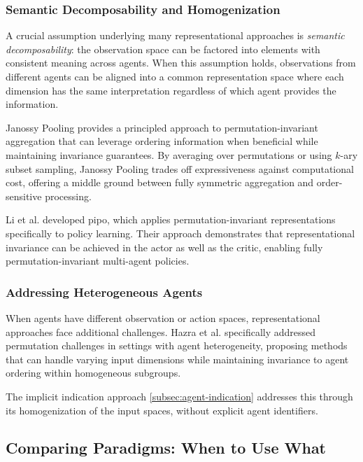 \subsubsection{Semantic Decomposability and Homogenization}

A crucial assumption underlying many representational approaches
is \emph{semantic decomposability}: the observation space can be
factored into elements with consistent meaning across agents.
When this assumption holds, observations from different agents
can be aligned into a common representation space where each
dimension has the same interpretation regardless of which agent
provides the information.

Janossy Pooling \cite{murphy2019} provides a principled approach
to permutation-invariant aggregation that can leverage ordering
information when beneficial while maintaining invariance guarantees.
By averaging over permutations or using $k$-ary subset sampling,
Janossy Pooling trades off expressiveness against computational
cost, offering a middle ground between fully symmetric aggregation
and order-sensitive processing.

Li et al. \cite{li2021b} developed \gls{pipo}, which applies 
permutation-invariant representations specifically to policy learning. 
Their approach demonstrates that representational invariance 
can be achieved in the actor as well as the critic, 
enabling fully permutation-invariant multi-agent policies.

\subsubsection{Addressing Heterogeneous Agents}

When agents have different observation or action spaces,
representational approaches face additional challenges.
Hazra et al. \cite{hazra2024} specifically addressed permutation
challenges in settings with agent heterogeneity, proposing
methods that can handle varying input dimensions while
maintaining invariance to agent ordering within homogeneous
subgroups.

The implicit indication approach \cref{subsec:agent-indication}
addresses this through its homogenization of the input spaces,
without explicit agent identifiers.

\subsection{Comparing Paradigms: When to Use What}
\label{sec:paradigm-comparison}


